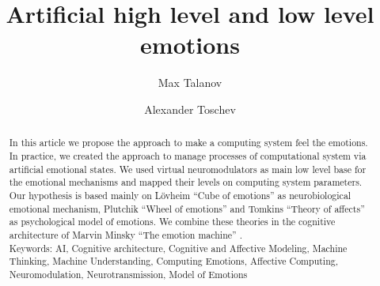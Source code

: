 \documentclass[oribibl]{llncs}
\begin{document}
\title{Artificial high level and low level emotions}
\author{Max Talanov \and Alexander Toschev}
\maketitle
\begin{abstract}
In this article we propose the approach to make a computing system feel the emotions. In practice, we created the approach to manage processes of computational system via artificial emotional states. We used virtual neuromodulators as main low level base for the emotional mechanisms and mapped their levels on computing system parameters. Our hypothesis is based mainly on L\"{o}vheim ``Cube of emotions'' \cite{cubeofemotions} as neurobiological emotional mechanism, Plutchik ``Wheel of emotions'' \cite{natureofemotions} and Tomkins ``Theory of affects'' \cite{primer_affect_psychology} as psychological model of emotions. We combine these theories in the cognitive architecture of Marvin Minsky ``The emotion machine'' \cite{emotionmachine}.\\
Keywords: AI, Cognitive architecture, Cognitive and Affective Modeling, Machine Thinking, Machine Understanding, Computing Emotions, Affective Computing, Neuromodulation, Neurotransmission, Model of Emotions
\end{abstract}



\end{document}
